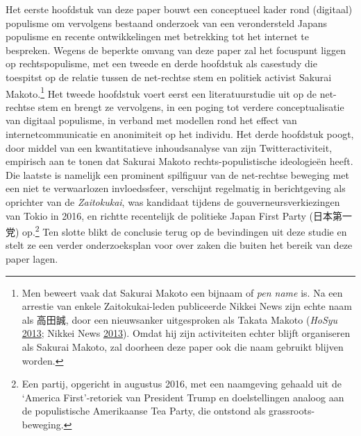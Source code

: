 \documentclass[10.5pt,dutch,]{article}
\begin{document}
Het eerste hoofdstuk van deze paper bouwt een conceptueel kader rond
(digitaal) populisme om vervolgens bestaand onderzoek van een
verondersteld Japans populisme en recente ontwikkelingen met betrekking
tot het internet te bespreken. Wegens de beperkte omvang van deze paper
zal het focuspunt liggen op rechtspopulisme, met een tweede en derde
hoofdstuk als casestudy die toespitst op de relatie tussen de net-rechtse stem en politiek activist Sakurai Makoto.\footnote{Men beweert
  vaak dat Sakurai Makoto een bijnaam of \emph{pen name} is. Na een
  arrestie van enkele Zaitokukai-leden publiceerde Nikkei News zijn
  echte naam als 高田誠, door een nieuwsanker uitgesproken als Takata
  Makoto (\emph{HoSyu}
  \protect\hyperlink{ref-hosyuux5fzaitokukaiux5f2013}{2013}; Nikkei News
  \protect\hyperlink{ref-nikkeiux5fnewsux5fdemo-meguriux5f2013}{2013}).
  Omdat hij zijn activiteiten echter blijft organiseren als Sakurai
  Makoto, zal doorheen deze paper ook die naam gebruikt blijven worden.}
Het tweede hoofdstuk voert eerst een literatuurstudie uit op de net-rechtse stem en brengt ze vervolgens, in een poging tot verdere
conceptualisatie van digitaal populisme, in verband met modellen rond
het effect van internetcommunicatie en anonimiteit op het individu. Het
derde hoofdstuk poogt, door middel van een kwantitatieve inhoudsanalyse
van zijn Twitteractiviteit, empirisch aan te tonen dat Sakurai Makoto
rechts-populistische ideologieën heeft. Die laatste is namelijk een prominent spilfiguur van de
net-rechtse beweging met een niet te verwaarlozen invloedssfeer,
verschijnt regelmatig in berichtgeving als oprichter van de
\emph{Zaitokukai}, was kandidaat tijdens de gouverneursverkiezingen van
Tokio in 2016, en richtte recentelijk de politieke Japan First Party
(日本第一党) op.\footnote{Een partij, opgericht in augustus 2016, met
  een naamgeving gehaald uit de `America First'-retoriek van President
  Trump en doelstellingen analoog aan de populistische Amerikaanse Tea
  Party, die ontstond als grassroots-beweging.} Ten slotte blikt de
conclusie terug op de bevindingen uit deze studie en stelt ze een verder
onderzoeksplan voor over zaken die buiten het bereik van deze paper
lagen.
\end{document}
